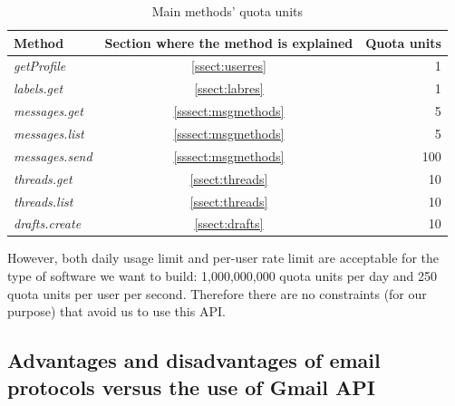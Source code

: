 \begin{table}[h]
	\centering
	\begin{tabular}{|l c r|}
		\hline
		\textbf{Method} & \textbf{Section where the method is explained} & \textbf{Quota units} \\
		\hline\hline
		\textit{getProfile} & \ref{ssect:userres} & 1\\ \hline
		\textit{labels.get} & \ref{ssect:labres} & 1\\ \hline
		\textit{messages.get} & \ref{sssect:msgmethods} & 5\\ \hline
		\textit{messages.list} & \ref{sssect:msgmethods} & 5\\ \hline
		\textit{messages.send} & \ref{sssect:msgmethods} & 100\\ \hline
		\textit{threads.get} & \ref{ssect:threads} & 10\\ \hline
		\textit{threads.list} & \ref{ssect:threads} & 10\\ \hline
		\textit{drafts.create} & \ref{ssect:drafts} & 10\\ \hline
	\end{tabular}
	\caption{Main methods' quota units}
	\label{tab:quotaUnits}
\end{table}

However, both daily usage limit and per-user rate limit are acceptable for the type of software we want to build: 1,000,000,000 quota units per day and 250 quota units per user per second. Therefore there are no constraints (for our purpose) that avoid us to use this API.

\subsection{Advantages and disadvantages of email protocols versus the use of Gmail API} \label{ssect:protvsapi}